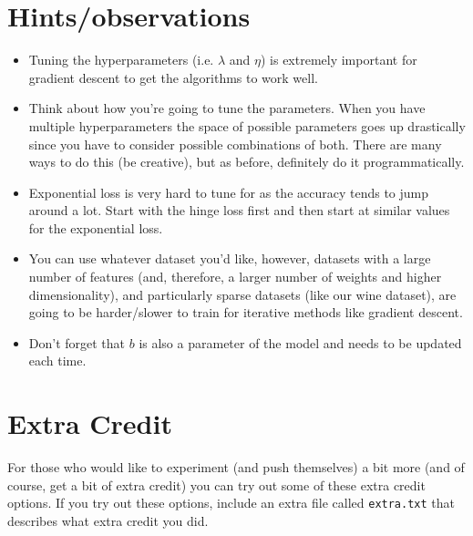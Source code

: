 \documentclass[11pt]{article}
\begin{document}
\section{Hints/observations}

\begin{itemize}

\item Tuning the hyperparameters (i.e. $\lambda$ and $\eta$) is extremely important for gradient descent to get the algorithms to work well.

\item Think about how you're going to tune the parameters.  When you have multiple hyperparameters the space of possible parameters goes up drastically since you have to consider possible combinations of both.  There are many ways to do this (be creative), but as before, definitely do it programmatically.

\item Exponential loss is very hard to tune for as the accuracy tends to jump around a lot.  Start with the hinge loss first and then start at similar values for the exponential loss.

\item You can use whatever dataset you'd like, however, datasets with a large number of features (and, therefore, a larger number of weights and higher dimensionality), and particularly sparse datasets (like our wine dataset), are going to be harder/slower to train for iterative methods like gradient descent.

\item Don't forget that $b$ is also a parameter of the model and needs to be updated each time.



\end{itemize}


\section{Extra Credit}

For those who would like to experiment (and push themselves) a bit more  (and of course, get a bit of extra credit) you can try out some of these extra credit options.   If you try out these options, include an extra file called \texttt{extra.txt} that describes what extra credit you did.
\end{document}
